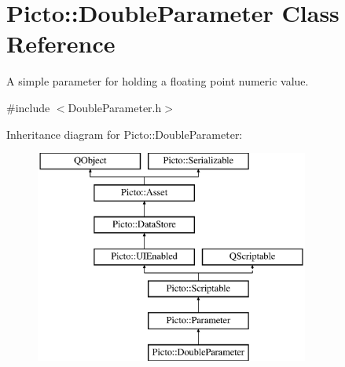 \hypertarget{class_picto_1_1_double_parameter}{\section{Picto\-:\-:Double\-Parameter Class Reference}
\label{class_picto_1_1_double_parameter}
}


A simple parameter for holding a floating point numeric value.  




{\ttfamily \#include $<$Double\-Parameter.\-h$>$}

Inheritance diagram for Picto\-:\-:Double\-Parameter\-:\begin{figure}[H]
\begin{center}
\leavevmode
\includegraphics[height=7.000000cm]{class_picto_1_1_double_parameter}
\end{center}
\end{figure}
